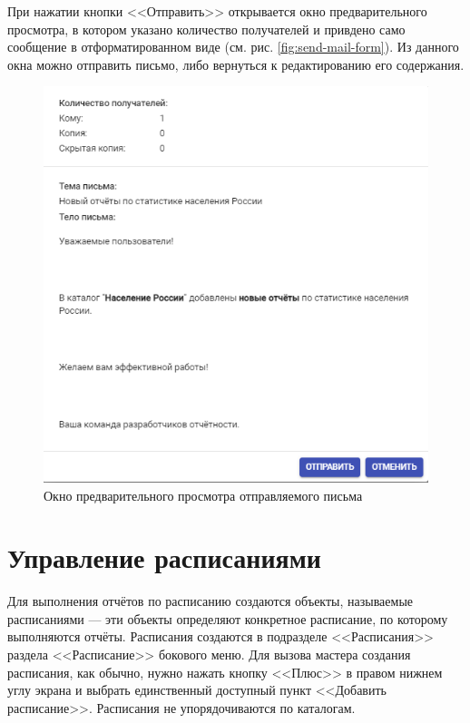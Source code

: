 \documentclass[../user-manual.tex]{subfiles}
\begin{document}
	При нажатии кнопки <<Отправить>> открывается окно предварительного просмотра, в котором указано количество получателей и привдено само сообщение в отформатированном виде (см. рис. \ref{fig:send-mail-form}). Из данного окна можно отправить письмо, либо вернуться к редактированию его содержания.
	
	\begin{figure}[h]
		\centering
		\includegraphics[width=\graphicswidth]{img/28-send-mail-preview.png}
		\caption{Окно предварительного просмотра отправляемого письма}
		\label{fig:send-mail-preview}
	\end{figure}
	
	\section{Управление расписаниями}
	
	Для выполнения отчётов по расписанию создаются объекты, называемые расписаниями --- эти объекты определяют конкретное расписание, по которому выполняются отчёты. Расписания создаются в подразделе <<Расписания>> раздела <<Расписание>> бокового меню. Для вызова мастера создания расписания, как обычно, нужно нажать кнопку <<Плюс>> в правом нижнем углу экрана и выбрать единственный доступный пункт <<Добавить расписание>>. Расписания не упорядочиваются по каталогам.
	
\end{document}
